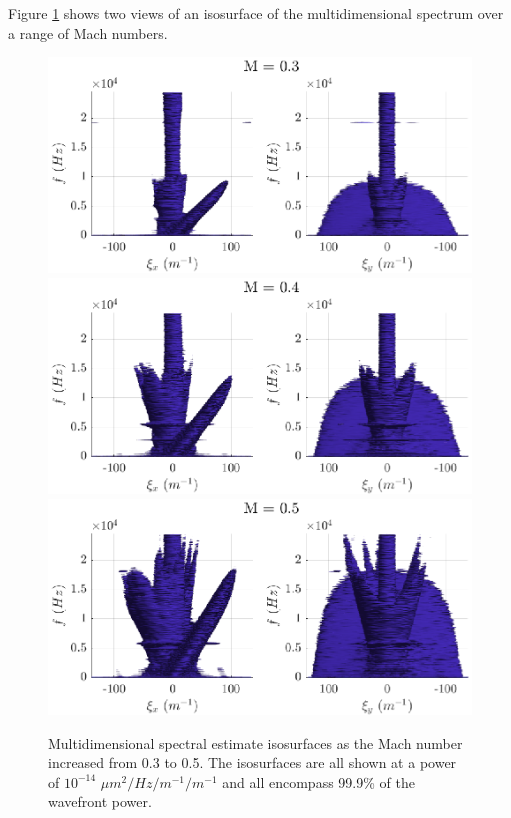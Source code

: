 Figure \ref{fig:04_dispersion_mach} shows two views of an isosurface of the multidimensional spectrum over a range of Mach numbers.
\begin{figure}
  \centering
  \includegraphics{../matlab/04_dispersion_analysis/dispersion_mach_0.3.eps}
  \includegraphics{../matlab/04_dispersion_analysis/dispersion_mach_0.4.eps}
  \includegraphics{../matlab/04_dispersion_analysis/dispersion_mach_0.5.eps}
  \caption{Multidimensional spectral estimate isosurfaces as the Mach number increased from 0.3 to 0.5. The isosurfaces are all shown at a power of $10^{-14}$ $\mu m^2/Hz/m^{-1}/m^{-1}$ and all encompass 99.9\% of the wavefront power.}
  \label{fig:04_dispersion_mach}
\end{figure}
